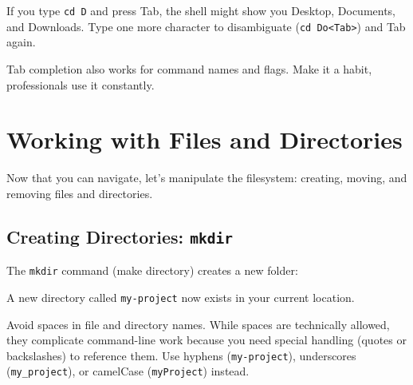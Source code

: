\documentclass[
  letterpaper,
  DIV=11,
  numbers=noendperiod]{scrreprt}
\newenvironment{Shaded}{\begin{snugshade}}{\end{snugshade}}
\newcommand{\ExtensionTok}[1]{\textcolor[rgb]{0.00,0.23,0.31}{#1}}
\newcommand{\NormalTok}[1]{\textcolor[rgb]{0.00,0.23,0.31}{#1}}
\begin{document}
If you type \texttt{cd\ D} and press Tab, the shell might show you
Desktop, Documents, and Downloads. Type one more character to
disambiguate (\texttt{cd\ Do\textless{}Tab\textgreater{}}) and Tab
again.

Tab completion also works for command names and flags. Make it a habit,
professionals use it constantly.

\section{Working with Files and
Directories}\label{working-with-files-and-directories}

Now that you can navigate, let's manipulate the filesystem: creating,
moving, and removing files and directories.

\subsection{\texorpdfstring{Creating Directories:
\texttt{mkdir}}{Creating Directories: mkdir}}\label{creating-directories-mkdir}

The \texttt{mkdir} command (make directory) creates a new folder:

\begin{codelisting}

\caption{\texttt{terminal}}

\begin{Shaded}
\end{Shaded}

\end{codelisting}

A new directory called \texttt{my-project} now exists in your current
location.

\begin{tcolorbox}[enhanced jigsaw, opacitybacktitle=0.6, arc=.35mm, colback=white, bottomtitle=1mm, opacityback=0, toprule=.15mm, left=2mm, colbacktitle=quarto-callout-tip-color!10!white, breakable, coltitle=black, toptitle=1mm, colframe=quarto-callout-tip-color-frame, bottomrule=.15mm, titlerule=0mm, title=\textcolor{quarto-callout-tip-color}{\faLightbulb}\hspace{0.5em}{Naming Conventions}, rightrule=.15mm, leftrule=.75mm]

Avoid spaces in file and directory names. While spaces are technically
allowed, they complicate command-line work because you need special
handling (quotes or backslashes) to reference them. Use hyphens
(\texttt{my-project}), underscores (\texttt{my\_project}), or camelCase
(\texttt{myProject}) instead.

\end{tcolorbox}
\end{document}
